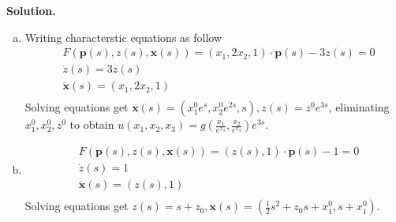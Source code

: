 \message{ !name(PDE-hw6-21935004-\unexpanded{谭焱}.tex)}\documentclass[a4paper]{book}
\newenvironment{solution}%
{\noindent\textbf{Solution.}}%
{\qedhere}
\numberwithin{equation}{chapter}
\theoremstyle{definition}
\begin{document}
\begin{solution}
  \begin{enumerate} [(a)]
  \item Writing characterstic equations as follow
    \begin{align*}
      &F(\mathbf{p}(s), z(s), \mathbf{x}(s)) = (x_1,2x_2,1) \cdot \mathbf{p}(s) - 3 z(s) = 0 \\
      &\dot{z}(s) = 3 z(s) \\
      &\dot{\mathbf{x}}(s) = (x_1, 2 x_2, 1) \\
    \end{align*}
    Solving equations get $\mathbf{x}(s) = (x^0_1e^{s},x^0_2e^{2s},s), z(s) = z^0 e^{3s}$, eliminating $x^0_1,x^0_2,z^0$ to obtain $u(x_1,x_2,x_3) = g(\frac{x_1}{e^{x_3}}, \frac{x_2}{e^{x_3}}) e^{3s}$.

    \item
      \begin{align*}
        &F(\mathbf{p}(s), z(s), \mathbf{x}(s)) = (z(s),1) \cdot \mathbf{p}(s) - 1 = 0 \\
        &\dot{z}(s) = 1 \\
        &\dot{\mathbf{x}}(s) = (z(s),1) \\
      \end{align*}
      Solving equations get $z(s) = s + z_0, \mathbf{x}(s) = (\frac{1}{2}s^2 + z_0 s + x^0_1, s + x^0_1)$. 
  \end{enumerate}
\end{solution}
\end{document}

